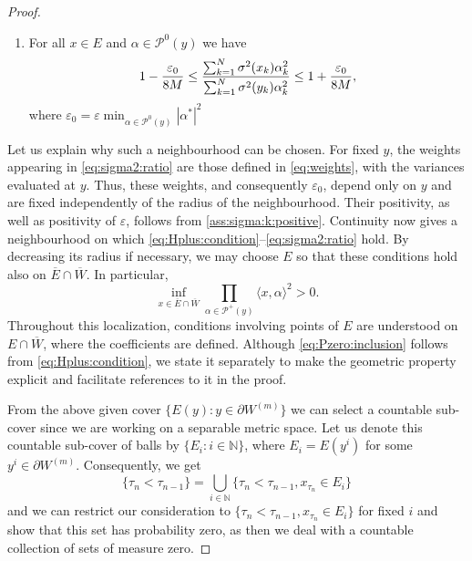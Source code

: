 \documentclass{article}
\numberwithin{equation}{section}
\newcommand{\N}{\mathbb{N}}
\newcommand{\C}{W}
\newcommand{\Cc}{\overline{W}}
\newcommand{\Cbm}{\partial \C^{(m)}}
\newcommand{\Pzero}{\mathcal{P}^0(y)}
\newcommand{\Pplus}{\mathcal{P}^+(y)}
\theoremstyle{plain}
\begin{document}
\begin{proof}
\begin{enumerate}[label=(\roman*)]
			 \item 
              \label{eq:sigma2:ratio} For all $x\in E$ and $\alpha\in \Pzero$ we have
				  \begin{equation*}
					    1-\frac{\varepsilon_0}{8M} \leq \frac{\sum_{k=1}^N \sigma^2(x_k)\alpha_k^2}{\sum_{k=1}^N \sigma^2(y_k)\alpha_k^2} \leq 1+\frac{\varepsilon_0}{8M}\/,
				  \end{equation*}		
                where $\varepsilon_0 = \varepsilon \min_{\alpha\in \Pzero} |\alpha^*|^2$ 
		\end{enumerate}
    Let us explain why such a neighbourhood can be chosen. For fixed $y$, the weights appearing in \ref{eq:sigma2:ratio} are those defined in \eqref{eq:weights}, with the variances evaluated at $y$. Thus, these weights, and consequently $\varepsilon_0$, depend only on $y$ and are fixed independently of the radius of the neighbourhood. Their positivity, as well as positivity of $\varepsilon$, follows from \ref{ass:sigma:k:positive}. Continuity now gives a neighbourhood on which \ref{eq:Hplus:condition}--\ref{eq:sigma2:ratio} hold. By decreasing its radius if necessary, we may choose $E$ so that these conditions hold also on $\overline E\cap\Cc$. In particular,
        \begin{equation*}
            \inf_{x\in\overline E\cap\Cc} \prod_{\alpha\in\Pplus}\langle x,\alpha\rangle^2 >0.
        \end{equation*}
    Throughout this localization, conditions involving points of $E$ are understood on $E\cap\Cc$, where the coefficients are defined. Although \ref{eq:Pzero:inclusion} follows from \ref{eq:Hplus:condition}, we state it separately to make the geometric property explicit and facilitate references to it in the proof.
    
    From the above given cover $\big\{E(y): y\in \Cbm\big\}$ we can select a countable sub-cover since we are working on a separable metric space. Let us denote this countable sub-cover of balls by $\{E_i: i\in \N\}$, where $E_i=E(y^i)$ for some $y^i\in \Cbm$. Consequently, we get
		$$
			\{\tau_{n}<\tau_{n-1}\} = \bigcup_{i\in\N}\{\tau_{n}<\tau_{n-1},x_{\tau_n} \in E_i\}
		$$
		and we can restrict our consideration to $\{\tau_{n}<\tau_{n-1},x_{\tau_n} \in E_i\}$ for fixed $i$ and show that this set has probability zero, as then we deal with a countable collection of sets of measure zero. 
		

\end{proof}
\end{document}
